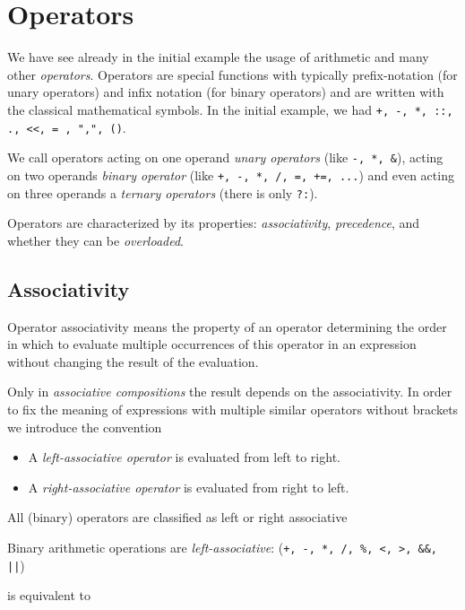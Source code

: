 \section{Operators\label{sec:operator}}
We have see already in the initial example the usage of arithmetic and many other \emph{operators}. Operators are special
functions with typically prefix-notation (for unary operators) and infix notation (for binary operators) and are written with
the classical mathematical symbols. In the initial example, we had \texttt{+, -, *, ::, ., <<, = , ",", ()}.

\begin{defn}
We call operators acting on one operand \emph{unary operators} (like \texttt{-, *, \&}), acting on two operands \emph{binary operator}
(like \texttt{+, -, *, /, =, +=, ...}) and even acting on three operands a \emph{ternary operators} (there is only \texttt{?:}).
\end{defn}

Operators are characterized by its properties: \emph{associativity}, \emph{precedence}, and whether they can be \emph{overloaded}.

\subsection{Associativity\label{sec:operator-associativity}}
\begin{defn}
  Operator associativity means the property of an operator determining the order in which to evaluate multiple occurrences of this operator in an expression without changing the result of the evaluation.
\end{defn}

Only in \emph{associative compositions} the result depends on the associativity. In order to fix the meaning of expressions with multiple
similar operators without brackets we introduce the convention
\begin{itemize}
\item A \emph{left-associative operator} is evaluated from left to right.
\item A \emph{right-associative operator} is evaluated from right to left.
\end{itemize}

All (binary) operators are classified as left or right associative

\begin{example}
  Binary arithmetic operations are \emph{left-associative}: (\texttt{+, -, *, /, \%, <, >, \&\&, ||})

   is equivalent to 
\end{example}

